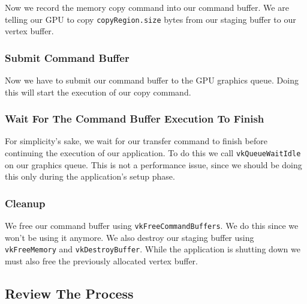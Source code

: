 Now we record the memory copy command into our command buffer.
We are telling our GPU to copy \texttt{copyRegion.size} bytes
from our staging buffer to our vertex buffer.

\begin{minipage}{\linewidth}{\noindent}
    
\end{minipage}

\subsubsection{Submit Command Buffer}

Now we have to submit our command buffer to the GPU graphics queue.
Doing this will start the execution of our copy command.

\begin{minipage}{\linewidth}{\noindent}
    
\end{minipage}

\subsubsection{Wait For The Command Buffer Execution To Finish}

For simplicity's sake, we wait for our transfer command to finish
before continuing the execution of our application.
To do this we call \texttt{vkQueueWaitIdle} on our graphics queue.
This is not a performance issue, since we should be doing this
only during the application's setup phase.

\subsubsection{Cleanup}

We free our command buffer using \texttt{vkFreeCommandBuffers}.
We do this since we won't be using it anymore.
We also destroy our staging buffer using \texttt{vkFreeMemory}
and \texttt{vkDestroyBuffer}.
While the application is shutting down we must also free the
previously allocated vertex buffer.

\subsection{Review The Process}

